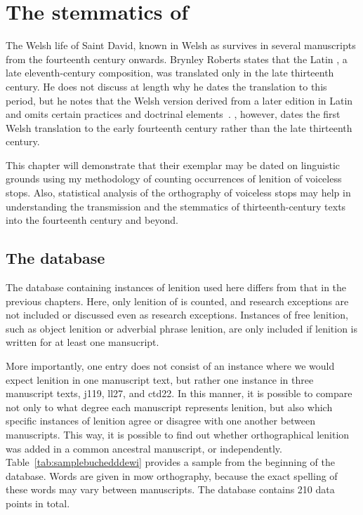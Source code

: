 \chapter{The stemmatics of }
\label{cha:stemm-mwbuch-dewi}
The Welsh life of Saint David, known in Welsh as  survives in several manuscripts from the fourteenth century onwards. Brynley Roberts states that the Latin , a late eleventh-century composition, was translated only in the late thirteenth century. He does not discuss at length why he dates the translation to this period, but he notes that the Welsh version derived from a later edition in Latin and omits certain practices and doctrinal elements~\autocite[218--219]{Rob_Ystoriaeu11}. \Textcite[liv]{Eva_Welsh88}, however, dates the first Welsh translation to the early fourteenth century rather than the late thirteenth century.

This chapter will demonstrate that their exemplar may be dated on linguistic grounds using my methodology of counting occurrences of lenition of voiceless stops. Also, statistical analysis of the orthography of voiceless stops may help in understanding the transmission and the stemmatics of thirteenth-century texts into the fourteenth century and beyond.



\section{The database}
\label{sec:database}

The database containing instances of lenition used here differs from that in the previous chapters. Here, only lenition of  is counted, and research exceptions are not included or discussed even as research exceptions. Instances of free lenition, such as object lenition or adverbial phrase lenition, are only included if lenition is written for at least one mansucript.


More importantly, one entry does not consist of an instance where we would expect lenition in one manuscript text, but rather one instance in three manuscript texts, \gls{j119}, \gls{ll27}, and \gls{ctd22}. In this manner, it is possible to compare not only to what degree each manuscript represents lenition, but also which specific instances of lenition agree or disagree with one another between manuscripts. This way, it is possible to find out whether orthographical lenition was added in a common ancestral manuscript, or independently. Table~\ref{tab:samplebuchedddewi} provides a sample from the beginning of the database. Words are given in \gls{mow} orthography, because the exact spelling of these words may vary between manuscripts. The database contains 210 data points in total.

